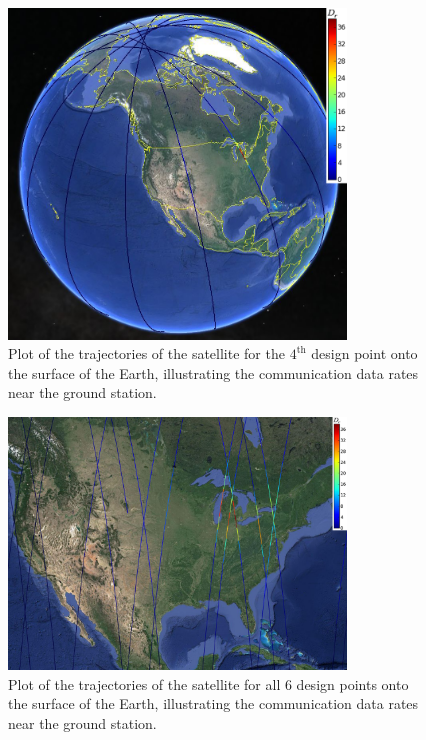 \documentclass[]{aiaa-tc} %
\begin{document}
        \begin{figure}
        \centering
        \includegraphics[width=0.8\textwidth]{images/pt3_gearth3}
        \caption[width=0.4\textwidth]{Plot of the trajectories of the satellite
        for the $4^{\textrm{th}}$ design point onto the surface of the Earth, illustrating the
        communication data rates near the ground station.
        \label{pt3_g_earth}
        }
        
        \end{figure}


        \begin{figure}
        \centering
        \includegraphics[width=0.8\textwidth]{images/allpts_map_data}
        \caption[width=0.4\textwidth]{Plot of the trajectories of the satellite
        for all 6 design points onto the surface of the Earth, illustrating the
        communication data rates near the ground station.
        \label{allpt_flatmap}
        }
        
        \end{figure}
\end{document}
